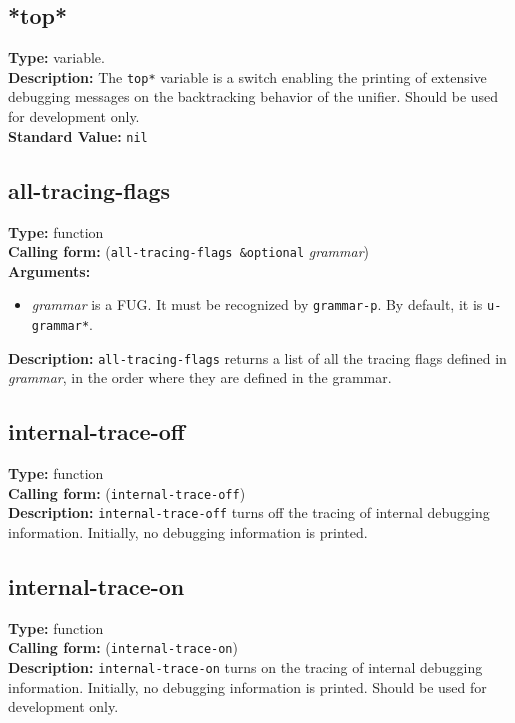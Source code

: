 \documentclass[10pt,a4paper]{report}
\begin{document}
\subsection{*top*}
{\bf Type:} variable.
\\{\bf Description:} The {\tt *top*} variable is a switch enabling
the printing of extensive debugging messages on the backtracking
behavior of the unifier. Should be used for development only.
\\{\bf Standard Value:} {\tt nil}

\subsection{all-tracing-flags}
{\bf Type:} function
\\{\bf Calling form:} ({\tt all-tracing-flags \&optional} {\em grammar})
\\{\bf Arguments:} 
\begin{itemize}
\item {\em grammar} is a FUG.  It must be recognized by {\tt grammar-p}.  By default,
it is {\tt *u-grammar*}.
\end{itemize}
{\bf Description:} {\tt all-tracing-flags} returns a list of all the tracing
flags defined in {\em grammar}, in the order where they are defined in the
grammar. 


\subsection{internal-trace-off}
{\bf Type:} function
\\{\bf Calling form:} ({\tt internal-trace-off})
\\{\bf Description:} {\tt internal-trace-off} turns off the tracing of
internal debugging information. Initially, no debugging
information is printed.

\subsection{internal-trace-on}
{\bf Type:} function
\\{\bf Calling form:} ({\tt internal-trace-on})
\\{\bf Description:} {\tt internal-trace-on} turns on the tracing of
internal debugging information. Initially, no debugging
information is printed. Should be used for development only.
\end{document}
